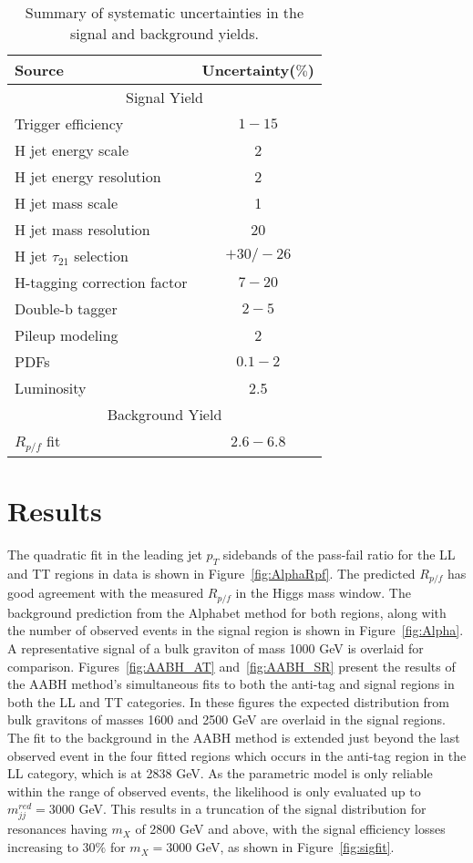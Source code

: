 \begin{table}[h!]
\begin{center}
    \begin{tabular}{l c}
    \hline
    \hline
    Source &  Uncertainty($\%$) \\
    \hline
    \multicolumn{2}{c}{Signal Yield}\\
    Trigger efficiency & $1-15$\\
    H jet energy scale & 2 \\
    H jet energy resolution & 2 \\
    H jet mass scale & 1 \\
    H jet mass resolution & 20 \\
    H jet $\tau_{21}$ selection & $+30/-26$ \\
    H-tagging correction factor & $7-20$\\
    Double-b tagger & $2-5$ \\
    Pileup modeling & 2 \\
    PDFs & $0.1-2$ \\
    Luminosity & 2.5 \\
    \multicolumn{2}{c}{Background Yield}\\
    $R_{p/f}$ fit & $2.6-6.8$ \\
    \hline
    \hline
    \end{tabular}
    \caption{Summary of systematic uncertainties in the signal and background yields. \label{tab:SysUnc}}
\end{center}
\end{table}


\section{Results}
\label{sec:Results}

The quadratic fit in the leading jet $p_{T}$ sidebands of the pass-fail ratio for the LL and TT regions in data is shown in Figure~\ref{fig:AlphaRpf}. The predicted $R_{p/f}$ has good agreement with the measured $R_{p/f}$ in the Higgs mass window. The background prediction from the Alphabet method for both regions, along with the number of observed events in the signal region is shown in Figure~\ref{fig:Alpha}. A representative signal of a bulk graviton of mass 1000 GeV is overlaid for comparison. Figures~\ref{fig:AABH_AT} and~\ref{fig:AABH_SR} present the results of the AABH method's simultaneous fits to both the anti-tag and signal regions in both the LL and TT categories. In these figures the expected distribution from bulk gravitons of masses 1600 and 2500 GeV are overlaid in the signal regions. The fit to the background in the AABH method is extended just beyond the last observed event in the four fitted regions which occurs in the anti-tag region in the LL category, which is at 2838 GeV. As the parametric model is only reliable within the range of observed events, the likelihood is only evaluated up to $m_{jj}^{red} = 3000$ GeV. This results in a truncation of the signal distribution for resonances having $m_{X}$ of 2800 GeV and above, with the signal efficiency losses increasing to $30\%$ for $m_{X}=3000$ GeV, as shown in Figure~\ref{fig:sigfit}.

